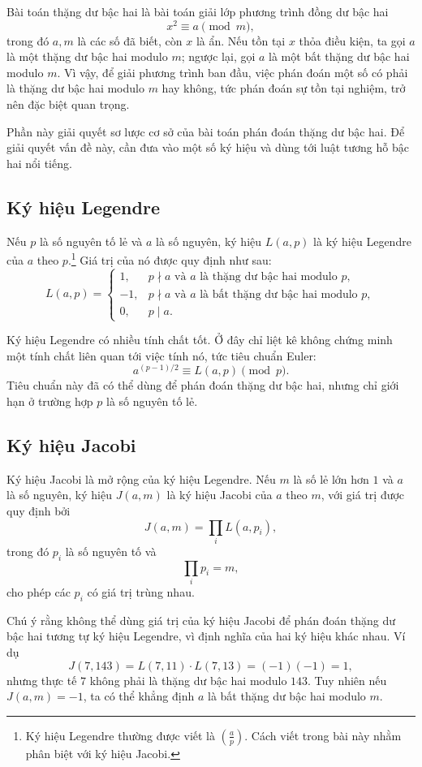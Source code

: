 \documentclass[11pt]{article}
\begin{document}
Bài toán thặng dư bậc hai là bài toán giải lớp phương trình đồng dư bậc hai
\[
  x^2\equiv a\pmod m,
\]
trong đó $a,m$ là các số đã biết, còn $x$ là ẩn. Nếu tồn tại $x$ thỏa điều
kiện, ta gọi $a$ là một thặng dư bậc hai modulo $m$; ngược lại, gọi $a$ là
một bất thặng dư bậc hai modulo $m$. Vì vậy, để giải phương trình ban đầu,
việc phán đoán một số có phải là thặng dư bậc hai modulo $m$ hay không, tức
phán đoán sự tồn tại nghiệm, trở nên đặc biệt quan trọng.

Phần này giải quyết sơ lược cơ sở của bài toán phán đoán thặng dư bậc hai. Để
giải quyết vấn đề này, cần đưa vào một số ký hiệu và dùng tới luật tương hỗ
bậc hai nổi tiếng.

\subsection{Ký hiệu Legendre}

Nếu $p$ là số nguyên tố lẻ và $a$ là số nguyên, ký hiệu $L(a,p)$ là ký hiệu
Legendre của $a$ theo $p$.\footnote{Ký hiệu Legendre thường được viết là
$\left(\frac{a}{p}\right)$. Cách viết trong bài này nhằm phân biệt với ký
hiệu Jacobi.} Giá trị của nó được quy định như sau:
\[
  L(a,p)=
  \begin{cases}
    1, & p\nmid a \text{ và } a \text{ là thặng dư bậc hai modulo } p,\\
    -1, & p\nmid a \text{ và } a \text{ là bất thặng dư bậc hai modulo } p,\\
    0, & p\mid a.
  \end{cases}
\]

Ký hiệu Legendre có nhiều tính chất tốt. Ở đây chỉ liệt kê không chứng minh
một tính chất liên quan tới việc tính nó, tức tiêu chuẩn Euler:
\[
  a^{(p-1)/2}\equiv L(a,p)\pmod p.
\]
Tiêu chuẩn này đã có thể dùng để phán đoán thặng dư bậc hai, nhưng chỉ giới
hạn ở trường hợp $p$ là số nguyên tố lẻ.

\subsection{Ký hiệu Jacobi}

Ký hiệu Jacobi là mở rộng của ký hiệu Legendre. Nếu $m$ là số lẻ lớn hơn $1$
và $a$ là số nguyên, ký hiệu $J(a,m)$ là ký hiệu Jacobi của $a$ theo $m$, với
giá trị được quy định bởi
\[
  J(a,m)=\prod_i L(a,p_i),
\]
trong đó $p_i$ là số nguyên tố và
\[
  \prod_i p_i=m,
\]
cho phép các $p_i$ có giá trị trùng nhau.

Chú ý rằng không thể dùng giá trị của ký hiệu Jacobi để phán đoán thặng dư bậc
hai tương tự ký hiệu Legendre, vì định nghĩa của hai ký hiệu khác nhau. Ví dụ
\[
  J(7,143)=L(7,11)\cdot L(7,13)=(-1)(-1)=1,
\]
nhưng thực tế $7$ không phải là thặng dư bậc hai modulo $143$. Tuy nhiên nếu
$J(a,m)=-1$, ta có thể khẳng định $a$ là bất thặng dư bậc hai modulo $m$.
\end{document}
